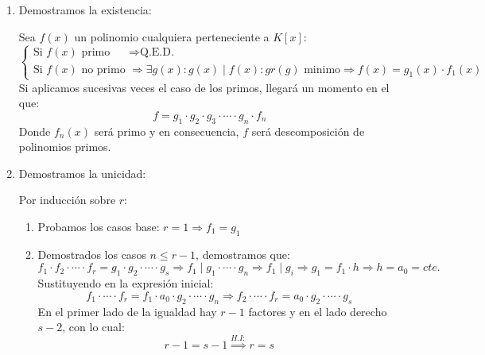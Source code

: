 \documentclass[10pt,a4paper,openright]{book}
\theoremstyle{break}
\begin{document}
\begin{enumerate}
\item Demostramos la existencia:\par
Sea $f(x)$ un polinomio cualquiera perteneciente a $K[x]$:
$$
\begin{cases}
\mbox{Si }f(x)\mbox{ primo} & \Rightarrow \mbox{Q.E.D.} \\
\mbox{Si }f(x)\mbox{ no primo} & \Rightarrow \exists g(x): g(x)\mid f(x) : gr(g)\mbox{ minimo}\Rightarrow f(x)=g_1(x)\cdot f_1(x)
\end{cases}
$$
Si aplicamos sucesivas veces el caso de los primos, llegará un momento en el que:
$$f=g_1\cdot g_2\cdot g_3 \cdot \cdots \cdot g_n \cdot f_n$$
Donde $f_n(x)$ será primo y en consecuencia, $f$ será descomposición de polinomios primos.

\item Demostramos la unicidad:\par
Por inducción sobre $r$:
\begin{enumerate}
\item Probamos los casos base: $r=1\Rightarrow f_1=g_1$

\item Demostrados los casos $n\leq r-1$, demostramos que:
$$f_1\cdot f_2 \cdot \cdots \cdot f_r=g_1\cdot g_2 \cdot \cdots \cdot g_s \Rightarrow f_1\mid g_1\cdot \cdots \cdot g_n\Rightarrow f_1\mid g_i \Rightarrow g_1=f_1\cdot h \Rightarrow h=a_0=cte.$$
Sustituyendo en la expresión inicial:
$$f_1\cdot \cdots \cdot f_r=f_1\cdot a_0\cdot g_2\cdot \cdots \cdot g_n\Rightarrow f_2\cdot \cdots \cdot f_r=a_0\cdot g_2\cdot \cdots \cdot g_s$$
En el primer lado de la igualdad hay $r-1$ factores y en el lado derecho $s-2$, con lo cual:
$$r-1=s-1\stackrel{H.I:}{\Rightarrow }r=s$$
\end{enumerate}
\end{enumerate}
\end{document}

